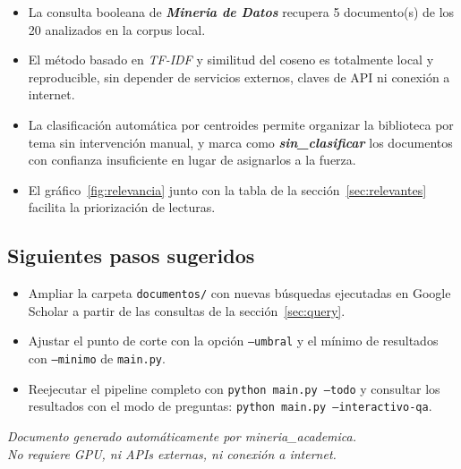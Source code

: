 \documentclass[11pt,a4paper]{article}
\newcommand{\tema}[1]{\textbf{\textit{#1}}}
\begin{document}
\begin{itemize}
\setlength{\itemsep}{4pt}
  \item La consulta booleana de \tema{ Mineria de Datos } recupera
        5 documento(s) de los 20
        analizados en la corpus local.
  \item El método basado en \textit{TF-IDF} y similitud del coseno es
        totalmente local y reproducible, sin depender de servicios externos,
        claves de API ni conexión a internet.
  \item La clasificación automática por centroides permite organizar la
        biblioteca por tema sin intervención manual, y marca como
        \tema{sin\_clasificar} los documentos con confianza insuficiente en
        lugar de asignarlos a la fuerza.
  \item El gráfico~\ref{fig:relevancia} junto con la tabla de la
        sección~\ref{sec:relevantes} facilita la priorización de lecturas.
\end{itemize}

\subsection*{Siguientes pasos sugeridos}

\begin{itemize}
\setlength{\itemsep}{3pt}
  \item Ampliar la carpeta \texttt{documentos/} con nuevas búsquedas
        ejecutadas en Google Scholar a partir de las consultas de la
        sección~\ref{sec:query}.
  \item Ajustar el punto de corte con la opción \texttt{--umbral} y el mínimo
        de resultados con \texttt{--minimo} de \texttt{main.py}.
  \item Reejecutar el pipeline completo con \texttt{python main.py --todo}
        y consultar los resultados con el modo de preguntas:
        \texttt{python main.py --interactivo-qa}.
\end{itemize}

\vfill
\begin{center}
\small
\textit{Documento generado automáticamente por mineria\_academica.\\
No requiere GPU, ni APIs externas, ni conexión a internet.}
\end{center}
\end{document}
